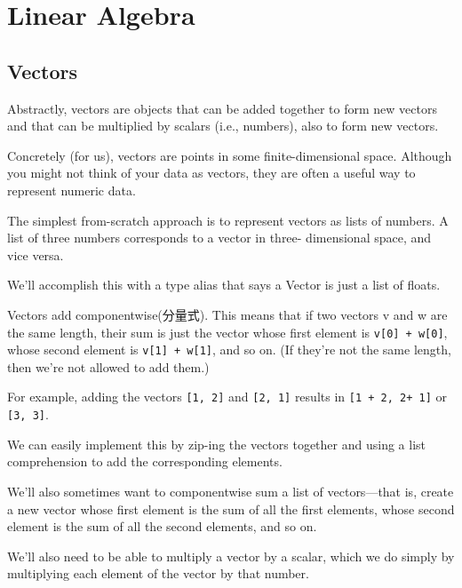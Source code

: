 \chapter{Linear Algebra}
\section{Vectors}
Abstractly, vectors are objects that can be added together to form new
vectors and that can be multiplied by scalars (i.e., numbers), also to form
new vectors.

Concretely (for us), vectors are points in some finite-dimensional space.
Although you might not think of your data as vectors, they are often a
useful way to represent numeric data.

The simplest from-scratch approach is to represent vectors as lists of
numbers. A list of three numbers corresponds to a vector in three-
dimensional space, and vice versa.

We'll accomplish this with a type alias that says a Vector is just a list of
floats.

Vectors add
componentwise(分量式). This means that if two vectors v and w are the same length,
their sum is just the vector whose first element is \verb|v[0] + w[0]|, whose
second element is \verb|v[1] + w[1]|, and so on. (If they're not the same length,
then we're not allowed to add them.)

For example, adding the vectors \verb|[1, 2]| and \verb|[2, 1]| results in \verb|[1 + 2, 2+ 1]| or \verb|[3, 3]|.

We can easily implement this by zip-ing the vectors together and using a
list comprehension to add the corresponding elements.

We'll also sometimes want to componentwise sum a list of vectors—that is,
create a new vector whose first element is the sum of all the first elements,
whose second element is the sum of all the second elements, and so on.

We'll also need to be able to multiply a vector by a scalar, which we do
simply by multiplying each element of the vector by that number.

A less obvious tool is the dot product. The dot product of two vectors is the
sum of their componentwise products. If w has magnitude 1, the dot product measures how far the vector v extends
in the w direction. Another way of saying this is that it's the length of the
vector you'd get if you projected v onto w.

Using this, it's easy to compute a vector's sum of squares, which we can use to compute its magnitude (or length)

